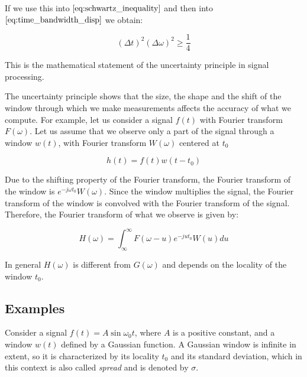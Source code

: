 If we use this into $\eqref{eq:schwartz_inequality}$ and then into $\eqref{eq:time_bandwidth_disp}$ we obtain:

\begin{equation}\label{eq:}
   (\Delta t)^2(\Delta \omega)^2 \geq \frac{1}{4} 
\end{equation}

This is the mathematical statement of the uncertainty principle in signal processing.

The uncertainty principle shows that the size, the shape and the shift of the window through which we make measurements affects the accuracy of what we compute. For example, let us consider a signal $f(t)$ with Fourier transform $F(\omega)$. Let us assume that we observe only a part of the signal through a window $w(t)$, with Fourier transform $W(\omega)$ centered at $t_0$

\begin{equation}\label{eq:}
    h(t) = f(t)w(t-t_0)
\end{equation}



Due to the shifting property of the Fourier transform, the Fourier transform of the window is $e^{-j\omega t_0}W(\omega)$. Since the window multiplies the signal, the Fourier transform of the window is convolved with the Fourier transform of the signal. Therefore, the Fourier transform of what we observe is given by:

\begin{equation}\label{eq:}
    H(\omega) = \int_{\infty}^{\infty}F(\omega - u)e^{-ju t_0}W(u) du
\end{equation}


In general $H(\omega)$ is different from $G(\omega)$ and depends on the locality of the window $t_0$.

\subsection{Examples}

Consider a signal $f(t)=A \sin \omega_{0} t$, where $A$ is a positive constant, and a window $w(t)$ defined by a Gaussian function. A Gaussian window is infinite in extent, so it is characterized by its locality $t_0$ and its standard deviation, which in this context is also called \textit{spread} and is denoted by $\sigma$. 

